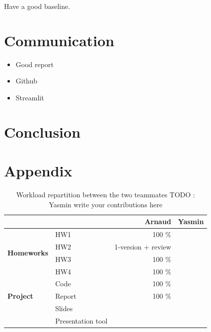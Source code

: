 \documentclass[a4paper,10pt]{article}
\begin{document}
Have a good baseline.



\section{Communication}


\begin{itemize}
  \item Good report
  \item Github
  \item Streamlit
\end{itemize}

\section{Conclusion}



\FloatBarrier
\section{Appendix}
\begin{table}
  \label{tab:nodes}
  \centering
  \begin{tabular}{llrr} \toprule
                                        &                   & \textbf{Arnaud}    & \textbf{Yasmin} \\ \midrule
    \multirow{4}{*}{\textbf{Homeworks}} & HW1               & 100 \%             &                 \\
                                        & HW2               & 1-version + review &                 \\
                                        & HW3               & 100 \%             &                 \\
                                        & HW4               & 100 \%             &                 \\ \cmidrule{2-4}
    \multirow{3}{*}{\textbf{Project}}   & Code              & 100 \%             &                 \\
                                        & Report            & 100 \%             &                 \\
                                        & Slides            &                    &                 \\
                                        & Presentation tool &                    &                 \\
    \bottomrule
  \end{tabular}
  \caption{ Workload repartition between the two teammates \color{red} TODO : Yasmin write your contributions here}
\end{table}
\end{document}
